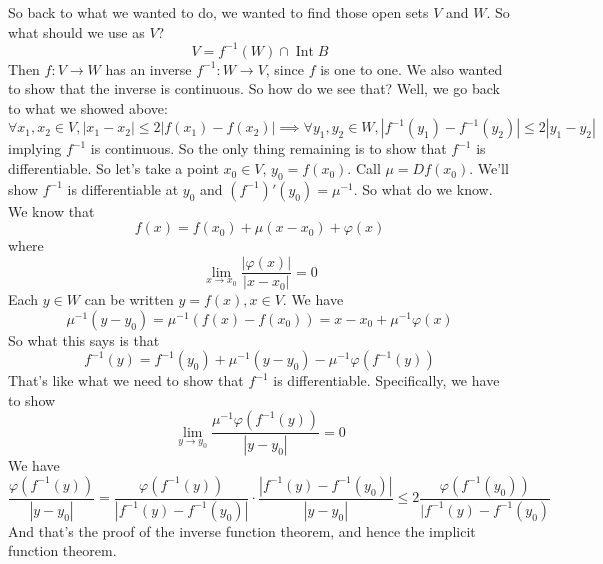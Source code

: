 \documentclass{article}
\DeclareMathOperator{\Int}{Int}
\begin{document}
So back to what we wanted to do, we wanted to find those open sets \(V\) and \(W\). So what should we use as \(V\)?
\[V = f^{-1}(W) \cap \Int B\]
Then \(f: V \to W\) has an inverse \(f^{-1}: W \to V\), since \(f\) is one to one. We also wanted to show that the inverse is continuous. So how do we see that? Well, we go back to what we showed above:
\[\forall x_1, x_2 \in V, |x_1 - x_2| \leq 2|f(x_1) - f(x_2)| \implies \forall y_1, y_2 \in W, |f^{-1}(y_1) - f^{-1}(y_2)| \leq 2|y_1 - y_2|\]
implying \(f^{-1}\) is continuous. So the only thing remaining is to show that \(f^{-1}\) is differentiable. So let's take a point \(x_0 \in V\), \(y_0 = f(x_0)\). Call \(\mu = Df(x_0)\). We'll show \(f^{-1}\) is differentiable at \(y_0\) and \((f^{-1})'(y_0) = \mu^{-1}\). So what do we know. We know that
\[f(x) = f(x_0) + \mu(x - x_0) + \varphi(x)\]
where
\[\lim_{x \to x_0}\frac{|\varphi(x)|}{|x - x_0|} = 0\]
Each \(y \in W\) can be written \(y = f(x), x \in V\). We have
\[\mu^{-1}(y - y_0) = \mu^{-1}(f(x) - f(x_0)) = x - x_0 + \mu^{-1}\varphi(x)\]
So what this says is that
\[f^{-1}(y) = f^{-1}(y_0) + \mu^{-1}(y - y_0) - \mu^{-1}\varphi(f^{-1}(y))\]
That's like what we need to show that \(f^{-1}\) is differentiable. Specifically, we have to show
\[\lim_{y \to y_0}\frac{\mu^{-1}\varphi(f^{-1}(y))}{|y - y_0|} = 0\]
We have
\[\frac{\varphi(f^{-1}(y))}{|y - y_0|} = \frac{\varphi(f^{-1}(y))}{|f^{-1}(y) - f^{-1}(y_0)|} \cdot \frac{|f^{-1}(y) - f^{-1}(y_0)|}{|y - y_0|} \leq 2\frac{\varphi(f^{-1}(y_0))}{|f^{-1}(y) - f^{-1}(y_0)}\]
And that's the proof of the inverse function theorem, and hence the implicit function theorem.
\end{document}
